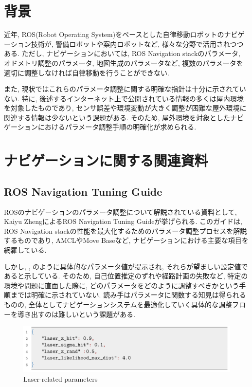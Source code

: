 
\section{背景}
近年, ROS(Robot Operating System)をベースとした自律移動ロボットのナビゲーション技術が, 警備ロボットや案内ロボットなど, 様々な分野で活用されつつある.\cite{haikei_1} 
ただし, ナビゲーションにおいては, ROS Navigation stack\cite{navstack}のパラメータ, オドメトリ調整のパラメータ, 地図生成のパラメータなど, 複数のパラメータを
適切に調整しなければ自律移動を行うことができない. 

また, 現状ではこれらのパラメータ調整に関する明確な指針は十分に示されていない. 
特に, 後述するインターネット上で公開されている情報の多くは屋内環境を対象したものであり, 
センサ誤差や環境変動が大きく調整が困難な屋外環境に関連する情報は少ないという課題がある. 
そのため, 屋外環境を対象としたナビゲーションにおけるパラメータ調整手順の明確化が求められる. 
\newpage
\section{ナビゲーションに関する関連資料}
\subsection{ROS Navigation Tuning Guide}
ROSのナビゲーションのパラメータ調整について解説されている資料として, Kaiyu ZhengによるROS Navigation Tuning Guide\cite{zheng2017rosnavigation}が挙げられる. 
このガイドは, ROS Navigation stackの性能を最大化するためのパラメータ調整プロセスを解説するものであり, AMCLやMove Baseなど, ナビゲーションにおける主要な項目を網羅している. 

しかし, , のように具体的なパラメータ値が提示され, それらが望ましい設定値であると示している. 
そのため, 自己位置推定のずれや経路計画の失敗など, 特定の環境や問題に直面した際に, どのパラメータをどのように調整すべきかという手順までは明確に示されていない. 
読み手はパラメータに関数する知見は得られるものの, 全体としてナビゲーションシステムを最適化していく具体的な調整フローを導き出すのは難しいという課題がある. 
\begin{figure}[hbtp]
  \centering
 \includegraphics[keepaspectratio, scale=0.3]
      {images/senkou_1.png}
 \caption{Laser-related parameters}
 \label{Fig:laser-related parameters}
\end{figure}

